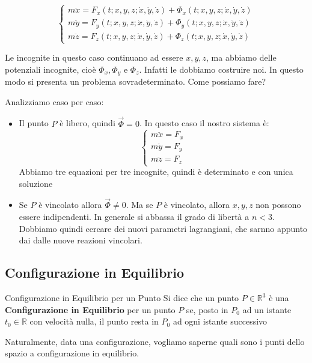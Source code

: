 \documentclass[11pt,a4paper,twoside]{article}
\theoremstyle{definition}
\begin{document}
\[ \begin{cases}
	m\ddot x = F_x(t;x,y,z;\dot x, \dot y, \dot z) + \Phi_x(t;x,y,z;\dot x, \dot y, \dot z)\\
	m\ddot y = F_y(t;x,y,z;\dot x, \dot y, \dot z) + \Phi_y(t;x,y,z;\dot x, \dot y, \dot z)\\
	m\ddot z = F_z(t;x,y,z;\dot x, \dot y, \dot z) + \Phi_z(t;x,y,z;\dot x, \dot y, \dot z)
\end{cases} \]

Le incognite in questo caso continuano ad essere $x,y,z$, ma abbiamo delle potenziali incognite, cioè $\Phi_x, \Phi_y$ e $\Phi_z$. Infatti le dobbiamo costruire noi. In questo modo si presenta un problema sovradeterminato. Come possiamo fare?

Analizziamo caso per caso:
\begin{itemize}
	\item Il punto $P$ è libero, quindi $\vec \Phi = 0$. In questo caso il nostro sistema è:
		\[ \begin{cases}
			m\ddot x = F_x\\
			m\ddot y = F_y\\
			m \ddot z = F_z
		\end{cases} \]
		Abbiamo tre equazioni per tre incognite, quindi è determinato e con unica soluzione
	\item Se $P$ è vincolato allora $\vec \Phi \neq 0$. Ma se $P$ è vincolato, allora $x,y,z$ non possono essere indipendenti. In generale si abbassa il grado di libertà a $n<3$. Dobbiamo quindi cercare dei nuovi parametri lagrangiani, che sarnno appunto dai dalle nuove reazioni vincolari.
\end{itemize}

\subsection{Configurazione in Equilibrio}

\begin{defn}{Configurazione in Equilibrio per un Punto}{}
	Si dice che un punto $P \in \mathbb R^3$ è una \textbf{Configurazione in Equilibrio} per un punto $P$ se, posto in $P_0$ ad un istante $t_0 \in \mathbb R$ con velocità nulla, il punto resta in $P_0$ ad ogni istante successivo
\end{defn}

Naturalmente, data una configurazione, vogliamo saperne quali sono i punti dello spazio a configurazione in equilibrio.
\end{document}
